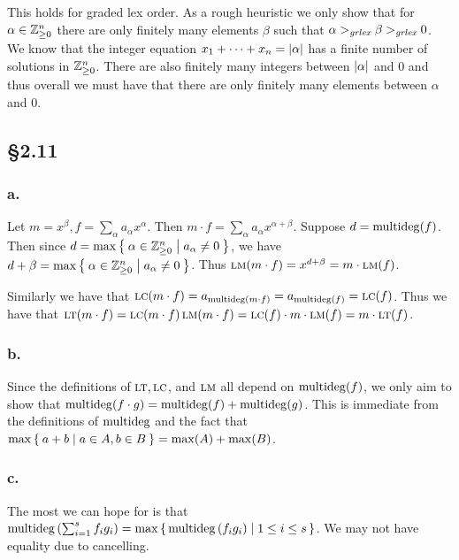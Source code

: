 \documentclass[letterpaper]{article}
\begin{document}
This holds for graded lex order.
As a rough heuristic we only show that for $\alpha \in \mathbb{Z}_{\geq 0}^{n}$ there are only finitely many elements $\beta$ such that $\alpha >_{\emph{grlex}} \beta >_{\emph{grlex}} 0$.
We know that the integer equation $x_{1} + \cdots + x_{n} = \abs{\alpha}$ has a finite number of solutions in $\mathbb{Z}_{\geq 0}^{n}$.
There are also finitely many integers between $\abs{\alpha}$ and $0$ and thus overall we must have that there are only finitely many elements between $\alpha$ and $0$.


\subsection*{\S 2.11}

\subsubsection*{a.}

Let $m = x^{\beta}, f = \sum_{\alpha} a_{\alpha}x^{\alpha}$.
Then $m \cdot f = \sum_{\alpha} a_{\alpha} x^{\alpha + \beta}$.
Suppose $d = \operatorname{multideg}(f)$.
Then since $d = \max\Set{\alpha \in \mathbb{Z}_{\geq 0}^{n} | a_{\alpha} \neq 0}$, we have $d + \beta = \max\Set{\alpha \in \mathbb{Z}_{\geq 0}^{n} | a_{\alpha} \neq 0}$.
Thus $\operatorname{\textsc{lm}}(m \cdot f) = x^{d + \beta} = m \cdot \operatorname{\textsc{lm}}(f)$.

Similarly we have that $\operatorname{\textsc{lc}}(m \cdot f) = a_{\operatorname{multideg}(m \cdot f)} = a_{\operatorname{multideg}(f)} = \operatorname{\textsc{lc}}(f)$.
Thus we have that $\operatorname{\textsc{lt}}(m \cdot f) = \operatorname{\textsc{lc}}(m \cdot f) \operatorname{\textsc{lm}}(m \cdot f) = \operatorname{\textsc{lc}}(f) \cdot m \cdot \operatorname{\textsc{lm}}(f) = m \cdot \operatorname{\textsc{lt}}(f)$.

\subsubsection*{b.}

Since the definitions of $\operatorname{\textsc{lt}}, \operatorname{\textsc{lc}}$, and $\operatorname{\textsc{lm}}$ all depend on $\operatorname{multideg}(f)$, we only aim to show that $\operatorname{multideg}(f \cdot g) = \operatorname{multideg}(f) + \operatorname{multideg}(g)$.
This is immediate from the definitions of $\operatorname{multideg}$ and the fact that $\max\Set{a + b | a \in A, b \in B} = \max(A) + \max(B)$.

\subsubsection*{c.}

The most we can hope for is that $\mdeg\pqty{\sum_{i = 1}^{s} f_{i} g_{i}} = \max\set{\mdeg\pqty{f_{i} g_{i}} | 1 \leq i \leq s}$.
We may not have equality due to cancelling.
\end{document}
